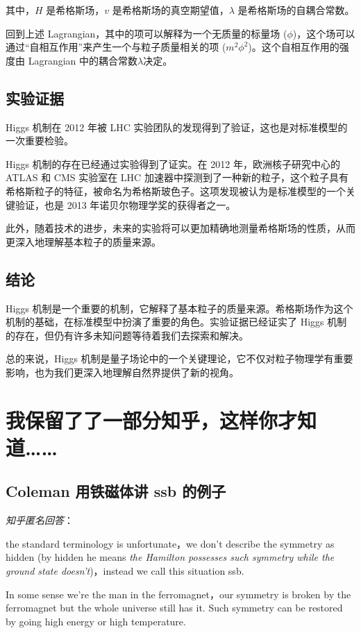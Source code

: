\documentclass[oneside,a4paper,openany,11pt]{ctexbook}
\begin{document}
\noindent 其中，$H$ 是希格斯场，$v$ 是希格斯场的真空期望值，$\lambda$ 是希格斯场的自耦合常数。

回到上述 Lagrangian，其中的项可以解释为一个无质量的标量场 ($\phi$)，这个场可以通过“自相互作用”来产生一个与粒子质量相关的项 ($m^2\phi^2$)。这个自相互作用的强度由 Lagrangian 中的耦合常数$\lambda$决定。

\section{实验证据}

Higgs 机制在 2012 年被 LHC 实验团队的发现得到了验证，这也是对标准模型的一次重要检验。

Higgs 机制的存在已经通过实验得到了证实。在 2012 年，欧洲核子研究中心的 ATLAS 和 CMS 实验室在 LHC 加速器中探测到了一种新的粒子，这个粒子具有希格斯粒子的特征，被命名为希格斯玻色子。这项发现被认为是标准模型的一个关键验证，也是 2013 年诺贝尔物理学奖的获得者之一。

此外，随着技术的进步，未来的实验将可以更加精确地测量希格斯场的性质，从而更深入地理解基本粒子的质量来源。

\section{结论}

Higgs 机制是一个重要的机制，它解释了基本粒子的质量来源。希格斯场作为这个机制的基础，在标准模型中扮演了重要的角色。实验证据已经证实了 Higgs 机制的存在，但仍有许多未知问题等待着我们去探索和解决。

总的来说，Higgs 机制是量子场论中的一个关键理论，它不仅对粒子物理学有重要影响，也为我们更深入地理解自然界提供了新的视角。

\chapter{我保留了了一部分知乎，这样你才知道……}

\section{Coleman 用铁磁体讲 ssb 的例子}

\emph{知乎匿名回答}：

the standard terminology is unfortunate，we don't describe the symmetry as hidden (by hidden he means \emph{the Hamilton possesses such symmetry while the ground state doesn't})，instead we call this situation ssb.

In some sense we're the man in the ferromagnet，our symmetry is broken by the ferromagnet but the whole universe still has it. Such symmetry can be restored by going high energy or high temperature.
\end{document}
